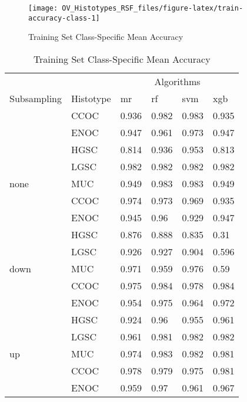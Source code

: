 \documentclass[
]{report}
\begin{document}
\begin{figure}[H]

{\centering \texttt{[image: OV\_Histotypes\_RSF\_files/figure-latex/train-accuracy-class-1]} 

}

\caption{Training Set Class-Specific Mean Accuracy}\label{fig:train-accuracy-class}
\end{figure}

\begin{table}

\caption{\label{tab:train-accuracy-class-table}Training Set Class-Specific Mean Accuracy}
\centering
\begin{tabular}[t]{l|l|l|l|l|l}
\hline
\multicolumn{2}{c|}{ } & \multicolumn{4}{c}{Algorithms} \\
\cline{3-6}
Subsampling & Histotype & mr & rf & svm & xgb\\
\hline
 & CCOC & 0.936 & 0.982 & 0.983 & 0.935\\
\cline{2-6}
 & ENOC & 0.947 & 0.961 & 0.973 & 0.947\\
\cline{2-6}
 & HGSC & 0.814 & 0.936 & 0.953 & 0.813\\
\cline{2-6}
 & LGSC & 0.982 & 0.982 & 0.982 & 0.982\\
\cline{2-6}
\multirow{-5}{*}{\raggedright\arraybackslash none} & MUC & 0.949 & 0.983 & 0.983 & 0.949\\
\cline{1-6}
 & CCOC & 0.974 & 0.973 & 0.969 & 0.935\\
\cline{2-6}
 & ENOC & 0.945 & 0.96 & 0.929 & 0.947\\
\cline{2-6}
 & HGSC & 0.876 & 0.888 & 0.835 & 0.31\\
\cline{2-6}
 & LGSC & 0.926 & 0.927 & 0.904 & 0.596\\
\cline{2-6}
\multirow{-5}{*}{\raggedright\arraybackslash down} & MUC & 0.971 & 0.959 & 0.976 & 0.59\\
\cline{1-6}
 & CCOC & 0.975 & 0.984 & 0.978 & 0.984\\
\cline{2-6}
 & ENOC & 0.954 & 0.975 & 0.964 & 0.972\\
\cline{2-6}
 & HGSC & 0.924 & 0.96 & 0.955 & 0.961\\
\cline{2-6}
 & LGSC & 0.961 & 0.981 & 0.982 & 0.982\\
\cline{2-6}
\multirow{-5}{*}{\raggedright\arraybackslash up} & MUC & 0.974 & 0.983 & 0.982 & 0.981\\
\cline{1-6}
 & CCOC & 0.978 & 0.979 & 0.975 & 0.981\\
\cline{2-6}
 & ENOC & 0.959 & 0.97 & 0.961 & 0.967\\

\end{tabular}
\end{table}
\end{document}
